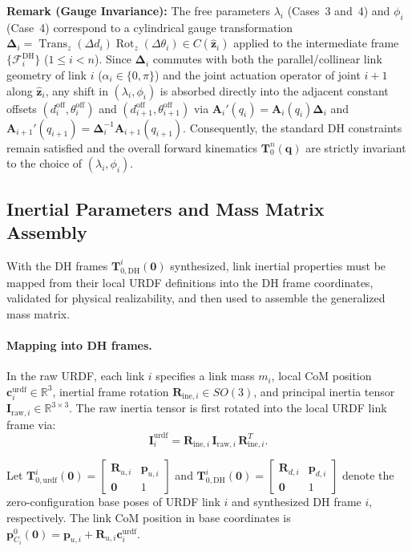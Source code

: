 \documentclass[fleqn,10pt]{article}
\begin{document}
\noindent\textbf{Remark (Gauge Invariance):} The free parameters $\lambda_i$ (Cases~3 and~4) and $\phi_i$ (Case~4) correspond to a cylindrical gauge transformation $\bm{\Delta}_i = \operatorname{Trans}_z(\Delta d_i)\operatorname{Rot}_z(\Delta\theta_i) \in C(\hat{\bm{z}}_i)$ applied to the intermediate frame $\{\mathcal{F}_i^{\mathrm{DH}}\}$ ($1 \le i < n$). Since $\bm{\Delta}_i$ commutes with both the parallel/collinear link geometry of link $i$ ($\alpha_i \in \{0,\pi\}$) and the joint actuation operator of joint $i+1$ along $\hat{\bm{z}}_i$, any shift in $(\lambda_i, \phi_i)$ is absorbed directly into the adjacent constant offsets $(d_i^{\mathrm{off}}, \theta_i^{\mathrm{off}})$ and $(d_{i+1}^{\mathrm{off}}, \theta_{i+1}^{\mathrm{off}})$ via $\bm{A}_i'(q_i) = \bm{A}_i(q_i)\bm{\Delta}_i$ and $\bm{A}_{i+1}'(q_{i+1}) = \bm{\Delta}_i^{-1}\bm{A}_{i+1}(q_{i+1})$. Consequently, the standard DH constraints remain satisfied and the overall forward kinematics $\bm{T}_0^n(\bm{q})$ are strictly invariant to the choice of $(\lambda_i, \phi_i)$.
	
	\subsection{Inertial Parameters and Mass Matrix Assembly}
	\label{subsec:inertial_mapping}
	With the DH frames $\bm{T}_{0,\text{DH}}^i(\bm{0})$ synthesized, link inertial properties must be mapped from their local URDF definitions into the DH frame coordinates, validated for physical realizability, and then used to assemble the generalized mass matrix.
	
	\paragraph{Mapping into DH frames.}
	In the raw URDF, each link $i$ specifies a link mass $m_i$, local CoM position $\bm{c}_i^{\text{urdf}} \in \mathbb{R}^3$, inertial frame rotation $\bm{R}_{\text{ine},i} \in SO(3)$, and principal inertia tensor $\bm{I}_{\text{raw},i} \in \mathbb{R}^{3 \times 3}$. The raw inertia tensor is first rotated into the local URDF link frame via:
	\begin{equation}
		\bm{I}_i^{\text{urdf}} = \bm{R}_{\text{ine},i} \, \bm{I}_{\text{raw},i} \, \bm{R}_{\text{ine},i}^T.
	\end{equation}
	
	Let $\bm{T}_{0,\text{urdf}}^i(\bm{0}) = \begin{bmatrix} \bm{R}_{u,i} & \bm{p}_{u,i} \\ \bm{0} & 1 \end{bmatrix}$ and $\bm{T}_{0,\text{DH}}^i(\bm{0}) = \begin{bmatrix} \bm{R}_{d,i} & \bm{p}_{d,i} \\ \bm{0} & 1 \end{bmatrix}$ denote the zero-configuration base poses of URDF link $i$ and synthesized DH frame $i$, respectively. The link CoM position in base coordinates is $\bm{p}_{C_i}^0(\bm{0}) = \bm{p}_{u,i} + \bm{R}_{u,i}\bm{c}_i^{\text{urdf}}$. 
	
\end{document}

